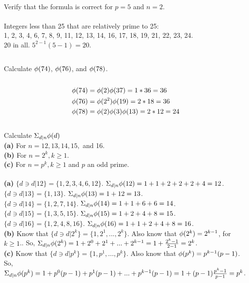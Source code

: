 \documentclass{article}
\begin{document}
\subsection{}
Verify that the formula is correct for $p = 5$ and $n = 2$.\\~\\
Integers less than 25 that are relatively prime to 25:\\
1, 2, 3, 4, 6, 7, 8, 9, 11, 12, 13, 14, 16, 17, 18, 19, 21, 22, 23, 24.\\
20 in all. $5^{2 - 1}(5 - 1) = 20$.

\subsection{}
Calculate $\phi(74)$, $\phi(76)$, and $\phi(78)$.\\~\\
\begin{align*}
    \phi(74) &= \phi(2)\phi(37) = 1 * 36 = 36\\
    \phi(76) &= \phi(2^2)\phi(19) = 2 * 18 = 36\\
    \phi(78) &= \phi(2)\phi(3)\phi(13) = 2 * 12 = 24
\end{align*}

\subsection{}
Calculate $\Sigma_{d|n}\phi(d)$\\
\textbf{(a)} For $n = 12, 13, 14, 15,$ and 16.\\
\textbf{(b)} For $n = 2^k, k \geq 1$.\\
\textbf{(c)} For $n = p^k, k \geq 1$ and $p$ an odd prime.\\~\\
\textbf{(a)} $\{d \ni d|12\} = \{1, 2, 3, 4, 6, 12\}$.
$\Sigma_{d|n}\phi(12) = 1 + 1 + 2 + 2 + 2 + 4 = 12$.\\
$\{d \ni d|13\} = \{1, 13\}$. $\Sigma_{d|n}\phi(13) = 1 + 12 = 13$.\\
$\{d \ni d|14\} = \{1, 2, 7, 14\}$.
$\Sigma_{d|n}\phi(14) = 1 + 1 + 6 + 6 = 14$.\\
$\{d \ni d|15\} = \{1, 3, 5, 15\}$.
$\Sigma_{d|n}\phi(15) = 1 + 2 + 4 + 8 = 15$.\\
$\{d \ni d|16\} = \{1, 2, 4, 8, 16\}$.
$\Sigma_{d|n}\phi(16) = 1 + 1 + 2 + 4 + 8 = 16$.\\
\textbf{(b)}
Know that $\{d \ni d|2^k\} = \{1, 2^1, ..., 2^k\}$.
Also know that $\phi(2^k) = 2^{k - 1}$, for $k \geq 1$..
So, $\Sigma_{d|n}\phi(2^k) = 1 + 2^0 + 2^1 + ... + 2^{k - 1}
= 1 + \frac{2^k - 1}{2 - 1} = 2^k$.\\
\textbf{(c)}
Know that $\{d \ni d|p^k\} = \{1, p^1, ..., p^k\}$.
Also know that $\phi(p^k) = p^{k - 1}(p - 1)$.
So, $\Sigma_{d|n}\phi(p^k) = 1 + p^0(p - 1) + p^1(p - 1) + ... + p^{k - 1}(p - 1)
= 1 + (p - 1)\frac{p^k - 1}{p - 1} = p^k$.
\end{document}

